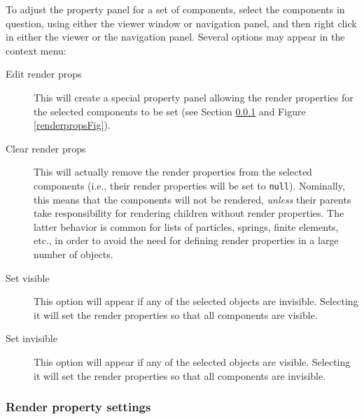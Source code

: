 \documentclass{article}
\begin{document}
To adjust the property panel for a set of components, select the components
in question, using either the viewer window or navigation panel, and then right 
click in either the viewer or the navigation panel. Several options may appear
in the context menu:

\begin{description}

\item[Edit render props]\mbox{}

This will create a special property panel allowing the render properties for
the selected components to be set (see Section \ref{renderPropSettingsSec}
and Figure \ref{renderpropsFig}).

\item[Clear render props]\mbox{}

This will actually remove the render properties
from the selected components (i.e., their render properties will be
set to {\tt null}).  Nominally, this means that the components will not be
rendered, {\it unless} their parents take responsibility for rendering
children without render properties. The latter behavior is common for
lists of particles, springs, finite elements, etc., in order to
avoid the need for defining render properties in a large number
of objects.

\item[Set visible]\mbox{}

This option will appear if any of the selected objects are
invisible. Selecting it will set the render properties so
that all components are visible.

\item[Set invisible]\mbox{}

This option will appear if any of the selected objects are
visible. Selecting it will set the render properties so
that all components are invisible.

\end{description}

\subsubsection{Render property settings}
\label{renderPropSettingsSec}
\end{document}
